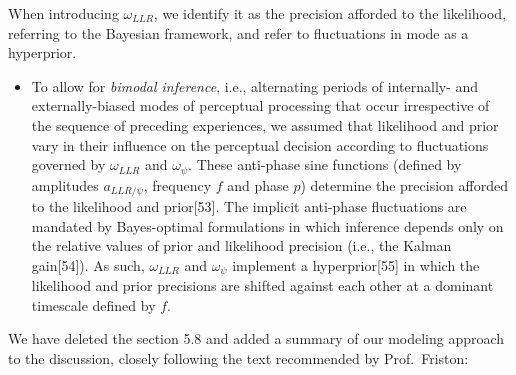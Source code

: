 \documentclass[
]{article}
\providecommand{\tightlist}{%
  \setlength{\itemsep}{0pt}\setlength{\parskip}{0pt}}
\begin{document}
When introducing \(\omega_{LLR}\), we identify it as the precision
afforded to the likelihood, referring to the Bayesian framework, and
refer to fluctuations in mode as a hyperprior.

\begin{itemize}
\tightlist
\item
  To allow for \emph{bimodal inference}, i.e., alternating periods of
  internally- and externally-biased modes of perceptual processing that
  occur irrespective of the sequence of preceding experiences, we
  assumed that likelihood and prior vary in their influence on the
  perceptual decision according to fluctuations governed by
  \(\omega_{LLR}\) and \(\omega_{\psi}\). These anti-phase sine
  functions (defined by amplitudes \(a_{LLR/\psi}\), frequency \(f\) and
  phase \(p\)) determine the precision afforded to the likelihood and
  prior{[}53{]}. The implicit anti-phase fluctuations are mandated by
  Bayes-optimal formulations in which inference depends only on the
  relative values of prior and likelihood precision (i.e., the Kalman
  gain{[}54{]}). As such, \(\omega_{LLR}\) and \(\omega_{\psi}\)
  implement a hyperprior{[}55{]} in which the likelihood and prior
  precisions are shifted against each other at a dominant timescale
  defined by \(f\).
\end{itemize}

We have deleted the section 5.8 and added a summary of our modeling
approach to the discussion, closely following the text recommended by
Prof.~Friston:
\end{document}
